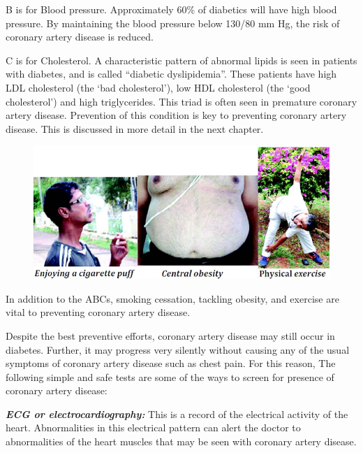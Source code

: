  \item B is for Blood pressure. Approximately 60\% of diabetics will have high blood pressure. By maintaining the blood pressure below 130/80 mm Hg, the risk of coronary artery disease is reduced.

 \item C is for Cholesterol. A characteristic pattern of abnormal lipids is seen in patients with diabetes, and is called “diabetic dyslipidemia”. These patients have high LDL cholesterol (the ‘bad cholesterol’), low HDL cholesterol (the ‘good cholesterol’) and high triglycerides. This triad is often seen in premature coronary artery disease. Prevention of this condition is key to preventing coronary artery disease. This is discussed in more detail in the next chapter.


\begin{figure}
\includegraphics{images/043.jpg}
\end{figure}

In addition to the ABCs, smoking cessation, tackling obesity, and exercise are vital to preventing coronary artery disease.


Despite the best preventive efforts, coronary artery disease may still occur in diabetes. Further, it may progress very silently without causing any of the usual symptoms of coronary artery disease such as chest pain. For this reason,  The following simple and safe tests are some of the ways to screen for presence of coronary artery disease:

\item \textbf{\textit{ECG or electrocardiography:}} This is a record of the electrical activity of the heart. Abnormalities in this electrical pattern can alert the doctor to abnormalities of the heart muscles that may be seen with coronary artery disease.

